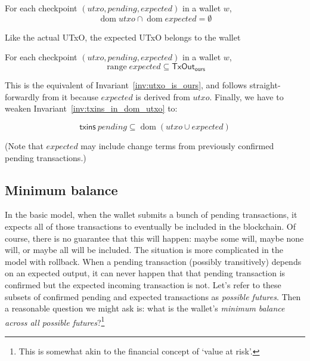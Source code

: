 \documentclass{article}
\DeclareMathOperator{\dom}{dom}
\DeclareMathOperator{\range}{range}
\theoremstyle{definition}{
  \newtheorem{lemma}{Lemma}[section] %
  \newtheorem{definition}[lemma]{Definition}
}
\theoremstyle{theorem}{
  \newtheorem{invariant}[lemma]{Invariant}
  \newtheorem{proofobligation}[lemma]{Proof Obligation}
}
\numberwithin{equation}{lemma}
\begin{document}
\begin{invariant}
For each checkpoint $(\mathit{utxo}, \mathit{pending}, \mathit{expected})$ in a wallet $w$,
\begin{equation*}
\dom \mathit{utxo} \cap \dom \mathit{expected} = \emptyset
\end{equation*}
\end{invariant}

Like the actual UTxO, the expected UTxO belongs to the wallet

\begin{invariant}
For each checkpoint $(\mathit{utxo}, \mathit{pending}, \mathit{expected})$ in a wallet $w$,
\begin{equation*}
\range \mathit{expected} \subseteq \mathsf{TxOut}_\mathsf{ours}
\end{equation*}
\end{invariant}

This is the equivalent of Invariant~\ref{inv:utxo_is_ours}, and follows
straight-forwardly from it because $\mathit{expected}$ is derived from
$\mathit{utxo}$. Finally, we have to weaken
Invariant~\ref{inv:txins_in_dom_utxo} to:

\begin{invariant}
\begin{equation*}
\mathsf{txins} ~ \mathit{pending} \subseteq \dom (\mathit{utxo} \cup \mathit{expected})
\end{equation*}
\label{inv:txins_in_dom_utxo_expected_pending}
\end{invariant}

(Note that $\mathit{expected}$ may include change terms from previously
confirmed pending transactions.)

\subsection{Minimum balance}

In the basic model, when the wallet submits a bunch of pending transactions, it
expects all of those transactions to eventually be included in the blockchain.
Of course, there is no guarantee that this will happen: maybe some will, maybe
none will, or maybe all will be included. The situation is more complicated in
the model with rollback. When a pending transaction (possibly transitively)
depends on an expected output, it can never happen that that pending transaction
is confirmed but the expected incoming transaction is not. Let's refer to these
subsets of confirmed pending and expected transactions as \emph{possible futures}.
Then a reasonable question we might ask is: what is the wallet's \emph{minimum
balance across all possible futures}?\footnote{This is somewhat akin to the
financial concept of `value at risk'.}
\end{document}
